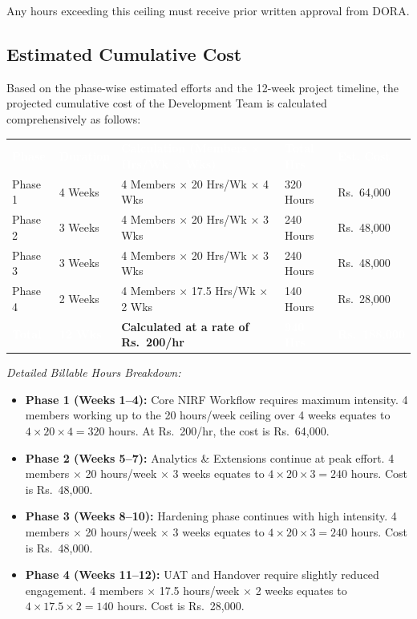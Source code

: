 \documentclass[11pt]{article}
\renewcommand{\arraystretch}{1.15}
\begin{document}
Any hours exceeding this ceiling must receive prior written approval from DORA.

\subsection{Estimated Cumulative Cost}
Based on the phase-wise estimated efforts and the 12-week project timeline, the projected cumulative cost of the Development Team is calculated comprehensively as follows:

\begin{table}[h]
\centering
\renewcommand{\arraystretch}{1.4}
\begin{tabular}{p{1.5cm} p{2cm} p{6cm} p{2cm} p{2cm}}
\rowcolor{primary}
\textcolor{white}{\textbf{Phase}} & \textcolor{white}{\textbf{Duration}} & \textcolor{white}{\textbf{Calculation (Members $\times$ Hrs/Wk $\times$ Wks)}} & \textcolor{white}{\textbf{Total Hrs}} & \textcolor{white}{\textbf{Est. Cost}} \\
\rowcolor{lightbg}
Phase 1 & 4 Weeks & 4 Members $\times$ 20 Hrs/Wk $\times$ 4 Wks & 320 Hours & Rs.~64,000 \\
\rowcolor{white}
Phase 2 & 3 Weeks & 4 Members $\times$ 20 Hrs/Wk $\times$ 3 Wks & 240 Hours & Rs.~48,000 \\
\rowcolor{lightbg}
Phase 3 & 3 Weeks & 4 Members $\times$ 20 Hrs/Wk $\times$ 3 Wks & 240 Hours & Rs.~48,000 \\
\rowcolor{white}
Phase 4 & 2 Weeks & 4 Members $\times$ 17.5 Hrs/Wk $\times$ 2 Wks & 140 Hours & Rs.~28,000 \\
\rowcolor{secondary}
\textcolor{white}{\textbf{Total}} & \textcolor{white}{\textbf{12 Wks}} & \textbf{Calculated at a rate of Rs.~200/hr} & \textcolor{white}{\textbf{940 Hrs}} & \textcolor{white}{\textbf{Rs.~188,000}} \\
\end{tabular}
\end{table}

\textit{Detailed Billable Hours Breakdown:}
\begin{itemize}[leftmargin=1.4em, itemsep=3pt]
\item \textbf{Phase 1 (Weeks 1--4):} Core NIRF Workflow requires maximum intensity. 4 members working up to the 20 hours/week ceiling over 4 weeks equates to $4 \times 20 \times 4 = 320$ hours. At Rs.~200/hr, the cost is Rs.~64,000.
\item \textbf{Phase 2 (Weeks 5--7):} Analytics \& Extensions continue at peak effort. 4 members $\times$ 20 hours/week $\times$ 3 weeks equates to $4 \times 20 \times 3 = 240$ hours. Cost is Rs.~48,000.
\item \textbf{Phase 3 (Weeks 8--10):} Hardening phase continues with high intensity. 4 members $\times$ 20 hours/week $\times$ 3 weeks equates to $4 \times 20 \times 3 = 240$ hours. Cost is Rs.~48,000.
\item \textbf{Phase 4 (Weeks 11--12):} UAT and Handover require slightly reduced engagement. 4 members $\times$ 17.5 hours/week $\times$ 2 weeks equates to $4 \times 17.5 \times 2 = 140$ hours. Cost is Rs.~28,000.
\end{itemize}
\end{document}
